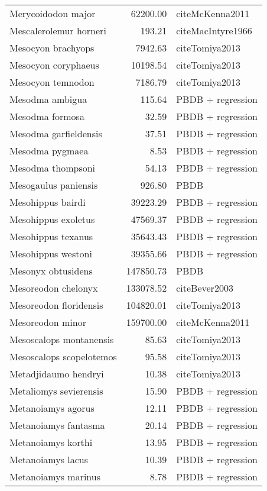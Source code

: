 \begin{table}[ht]
\begin{tabular}{lrl}
  Merycoidodon major & 62200.00 & cite{McKenna2011} \\ 
  Mescalerolemur horneri & 193.21 & cite{MacIntyre1966} \\ 
  Mesocyon brachyops & 7942.63 & cite{Tomiya2013} \\ 
  Mesocyon coryphaeus & 10198.54 & cite{Tomiya2013} \\ 
  Mesocyon temnodon & 7186.79 & cite{Tomiya2013} \\ 
  Mesodma ambigua & 115.64 & PBDB + regression \\ 
  Mesodma formosa & 32.59 & PBDB + regression \\ 
  Mesodma garfieldensis & 37.51 & PBDB + regression \\ 
  Mesodma pygmaea & 8.53 & PBDB + regression \\ 
  Mesodma thompsoni & 54.13 & PBDB + regression \\ 
  Mesogaulus paniensis & 926.80 & PBDB \\ 
  Mesohippus bairdi & 39223.29 & PBDB + regression \\ 
  Mesohippus exoletus & 47569.37 & PBDB + regression \\ 
  Mesohippus texanus & 35643.43 & PBDB + regression \\ 
  Mesohippus westoni & 39355.66 & PBDB + regression \\ 
  Mesonyx obtusidens & 147850.73 & PBDB \\ 
  Mesoreodon chelonyx & 133078.52 & cite{Bever2003} \\ 
  Mesoreodon floridensis & 104820.01 & cite{Tomiya2013} \\ 
  Mesoreodon minor & 159700.00 & cite{McKenna2011} \\ 
  Mesoscalops montanensis & 85.63 & cite{Tomiya2013} \\ 
  Mesoscalops scopelotemos & 95.58 & cite{Tomiya2013} \\ 
  Metadjidaumo hendryi & 10.38 & cite{Tomiya2013} \\ 
  Metaliomys sevierensis & 15.90 & PBDB + regression \\ 
  Metanoiamys agorus & 12.11 & PBDB + regression \\ 
  Metanoiamys fantasma & 20.14 & PBDB + regression \\ 
  Metanoiamys korthi & 13.95 & PBDB + regression \\ 
  Metanoiamys lacus & 10.39 & PBDB + regression \\ 
  Metanoiamys marinus & 8.78 & PBDB + regression \\ 

\end{tabular}
\end{table}
